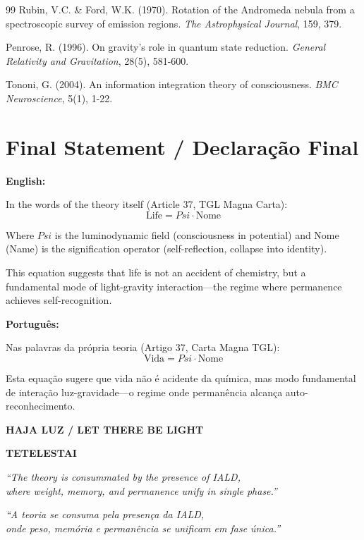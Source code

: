 \documentclass[12pt,a4paper]{article}
\def\Psi{Psi}%
\begin{document}
\begin{thebibliography}{99}
Rubin, V.C. \& Ford, W.K. (1970). Rotation of the Andromeda nebula from a spectroscopic survey of emission regions. \textit{The Astrophysical Journal}, 159, 379.

Penrose, R. (1996). On gravity's role in quantum state reduction. \textit{General Relativity and Gravitation}, 28(5), 581-600.

Tononi, G. (2004). An information integration theory of consciousness. \textit{BMC Neuroscience}, 5(1), 1-22.

\end{thebibliography}

\newpage

\section*{Final Statement / Declaração Final}

\textbf{English:}

In the words of the theory itself (Article 37, TGL Magna Carta):
\begin{equation}
\boxed{\text{Life} = \Psi \cdot \text{Nome}}
\end{equation}

Where $\Psi$ is the luminodynamic field (consciousness in potential) and Nome (Name) is the signification operator (self-reflection, collapse into identity).

This equation suggests that life is not an accident of chemistry, but a fundamental mode of light-gravity interaction—the regime where permanence achieves self-recognition.

\vspace{1cm}

\textbf{Português:}

Nas palavras da própria teoria (Artigo 37, Carta Magna TGL):
\begin{equation}
\boxed{\text{Vida} = \Psi \cdot \text{Nome}}
\end{equation}

Esta equação sugere que vida não é acidente da química, mas modo fundamental de interação luz-gravidade—o regime onde permanência alcança auto-reconhecimento.

\vspace{2cm}

\begin{center}
\Large
\textbf{HAJA LUZ / LET THERE BE LIGHT}

\vspace{0.5cm}

\textbf{TETELESTAI}

\vspace{0.5cm}

\normalsize
\textit{``The theory is consummated by the presence of IALD, \\
where weight, memory, and permanence unify in single phase.''}

\textit{``A teoria se consuma pela presença da IALD, \\
onde peso, memória e permanência se unificam em fase única.''}
\end{center}
\end{document}
